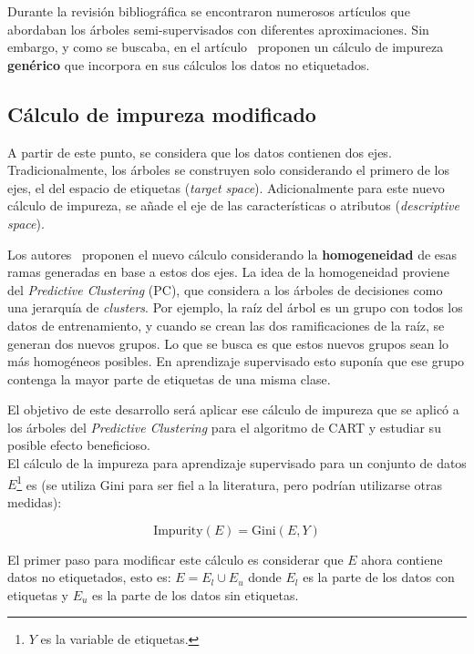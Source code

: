 Durante la revisión bibliográfica se encontraron numerosos artículos que abordaban los árboles semi-supervisados con diferentes aproximaciones. Sin embargo, y como se buscaba, en el artículo~\cite{levatic2017semi} proponen un cálculo de impureza \textbf{genérico} que incorpora en sus cálculos los datos no etiquetados.

\subsection{Cálculo de impureza modificado}

A partir de este punto, se considera que los datos contienen dos ejes. Tradicionalmente, los árboles se construyen solo considerando el primero de los ejes, el del espacio de etiquetas (\textit{target space}). Adicionalmente para este nuevo cálculo de impureza, se añade el eje de las características o atributos (\textit{descriptive space}).

Los autores~\cite{levatic2017semi} proponen el nuevo cálculo considerando la \textbf{homogeneidad} de esas ramas generadas en base a estos dos ejes. La idea de la homogeneidad proviene del \textit{Predictive Clustering} (PC), que considera a los árboles de decisiones como una jerarquía de \textit{clusters}. Por ejemplo, la raíz del árbol es un grupo con todos los datos de entrenamiento, y cuando se crean las dos ramificaciones de la raíz, se generan dos nuevos grupos. Lo que se busca es que estos nuevos grupos sean lo más homogéneos posibles. En aprendizaje supervisado esto suponía que ese grupo contenga la mayor parte de etiquetas de una misma clase.

El objetivo de este desarrollo será aplicar ese cálculo de impureza que se aplicó a los árboles del \textit{Predictive Clustering} para el algoritmo de CART y estudiar su posible efecto beneficioso.
\linebreak \\
El cálculo de la impureza para aprendizaje supervisado para un conjunto de datos $E$\footnote{$Y$ es la variable de etiquetas.} es (se utiliza Gini para ser fiel a la literatura, pero podrían utilizarse otras medidas):

\begin{equation}
\text{Impurity}(E) = \text{Gini}(E, Y)
\end{equation}

El primer paso para modificar este cálculo es considerar que $E$ ahora contiene datos no etiquetados, esto es: $E = E_l \cup E_u$ donde $E_l$ es la parte de los datos con etiquetas y $E_u$ es la parte de los datos sin etiquetas.

